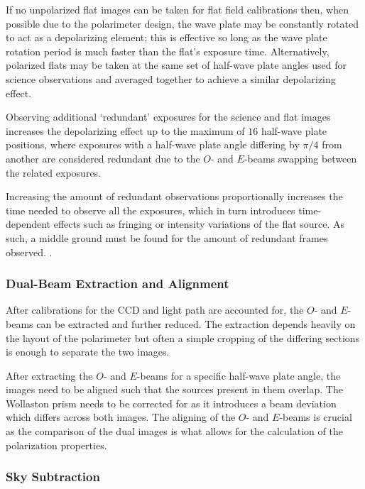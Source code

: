 If no unpolarized flat images can be taken for flat field calibrations then, when possible due to the polarimeter design, the wave plate may be constantly rotated to act as a depolarizing element; this is effective so long as the wave plate rotation period is much faster than the flat's exposure time. Alternatively, polarized flats may be taken at the same set of half-wave plate angles used for science observations and averaged together to achieve a similar depolarizing effect.

Observing additional `redundant' exposures for the science and flat images increases the depolarizing effect up to the maximum of $16$ half-wave plate positions, where exposures with a half-wave plate angle differing by $\pi / 4$ from another are considered redundant due to the $O$- and $E$-beams swapping between the related exposures.

Increasing the amount of redundant observations proportionally increases the time needed to observe all the exposures, which in turn introduces time-dependent effects such as fringing or intensity variations of the flat source. As such, a middle ground must be found for the amount of redundant frames observed. \citep{polarimetry_error, pol_optimize}.

\subsubsection{Dual-Beam Extraction and Alignment} \label{subsubsec:pol_oe_extract}

After calibrations for the \gls{CCD} and light path are accounted for, the $O$- and $E$-beams can be extracted and further reduced. The extraction depends heavily on the layout of the polarimeter but often a simple cropping of the differing sections is enough to separate the two images.

After extracting the $O$- and $E$-beams for a specific half-wave plate angle, the images need to be aligned such that the sources present in them overlap. The Wollaston prism needs to be corrected for as it introduces a beam deviation which differs across both images. The aligning of the $O$- and $E$-beams is crucial as the comparison of the dual images is what allows for the calculation of the polarization properties.

\subsubsection{Sky Subtraction} \label{subsubsec:pol_sky_subtract}

